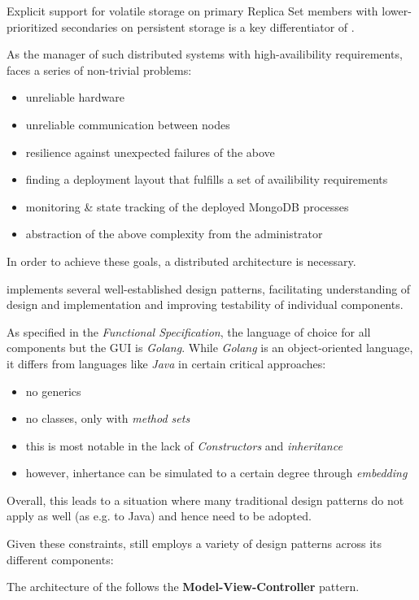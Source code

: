 Explicit support for volatile storage on primary Replica Set members with lower-prioritized secondaries on persistent
storage is a key differentiator of \mamid.

As the manager of such distributed systems with high-availibility requirements, \mamid faces a series of non-trivial problems:
\begin{itemize}
  \item unreliable hardware
  \item unreliable communication between nodes
  \item resilience against unexpected failures of the above 
  \item finding a deployment layout that fulfills a set of availibility requirements
  \item monitoring \& state tracking of the deployed MongoDB processes
  \item abstraction of the above complexity from the administrator
\end{itemize}

In order to achieve these goals, a distributed architecture is necessary.

\mamid implements several well-established design patterns, facilitating understanding of design and implementation and improving
testability of individual components.

As specified in the \emph{Functional Specification}, the language of choice for all components but the GUI is \emph{Golang}.
While \emph{Golang} is an object-oriented language, it differs from languages like \emph{Java} in certain critical approaches:
\begin{itemize}
  \item no generics
  \item no classes, only  with \emph{method sets}
  \item this is most notable in the lack of \emph{Constructors} and \emph{inheritance}
  \item however, inhertance can be simulated to a certain degree through \emph{embedding} %
\end{itemize}

Overall, this leads to a situation where many traditional design patterns do not apply as well (as e.g. to Java) and hence need
to be adopted.

Given these constraints, \mamid still employs a variety of design patterns across its different components:

The architecture of the  follows the \textbf{Model-View-Controller} pattern.

